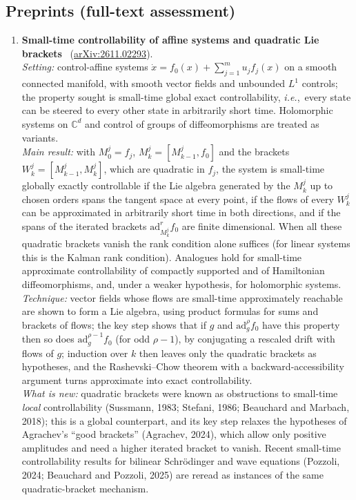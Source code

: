 \documentclass[11pt,a4paper]{article}
\newcommand{\ie}{\emph{i.e.},\ }
\newcommand{\Cset}{\mathbb{C}}
\begin{document}
\subsection*{Preprints (full-text assessment)}
\begin{enumerate}[leftmargin=*]
  \item \textbf{Small-time controllability of affine systems and quadratic Lie brackets}~\cite{beauchard2026small} (\href{https://arxiv.org/abs/2611.02293}{arXiv:2611.02293}).\\
  \emph{Setting:} control-affine systems $\dot x = f_0(x) + \sum_{j=1}^m u_j f_j(x)$ on a smooth connected manifold, with smooth vector fields and unbounded $L^1$ controls; the property sought is small-time global exact controllability, \ie every state can be steered to every other state in arbitrarily short time. Holomorphic systems on $\Cset^d$ and control of groups of diffeomorphisms are treated as variants.\\
  \emph{Main result:} with $M^j_0 = f_j$, $M^j_k = [M^j_{k-1}, f_0]$ and the brackets $W^j_k = [M^j_{k-1}, M^j_k]$, which are quadratic in $f_j$, the system is small-time globally exactly controllable if the Lie algebra generated by the $M^j_k$ up to chosen orders spans the tangent space at every point, if the flows of every $W^j_k$ can be approximated in arbitrarily short time in both directions, and if the spans of the iterated brackets $\mathrm{ad}^r_{M^j_k} f_0$ are finite dimensional. When all these quadratic brackets vanish the rank condition alone suffices (for linear systems this is the Kalman rank condition). Analogues hold for small-time approximate controllability of compactly supported and of Hamiltonian diffeomorphisms, and, under a weaker hypothesis, for holomorphic systems.\\
  \emph{Technique:} vector fields whose flows are small-time approximately reachable are shown to form a Lie algebra, using product formulas for sums and brackets of flows; the key step shows that if $g$ and $\mathrm{ad}^\rho_g f_0$ have this property then so does $\mathrm{ad}^{\rho-1}_g f_0$ (for odd $\rho - 1$), by conjugating a rescaled drift with flows of $g$; induction over $k$ then leaves only the quadratic brackets as hypotheses, and the Rashevski--Chow theorem with a backward-accessibility argument turns approximate into exact controllability.\\
  \emph{What is new:} quadratic brackets were known as obstructions to small-time \emph{local} controllability (Sussmann, 1983; Stefani, 1986; Beauchard and Marbach, 2018); this is a global counterpart, and its key step relaxes the hypotheses of Agrachev's ``good brackets'' (Agrachev, 2024), which allow only positive amplitudes and need a higher iterated bracket to vanish. Recent small-time controllability results for bilinear Schr{\"o}dinger and wave equations (Pozzoli, 2024; Beauchard and Pozzoli, 2025) are reread as instances of the same quadratic-bracket mechanism.\\

\end{enumerate}
\end{document}
